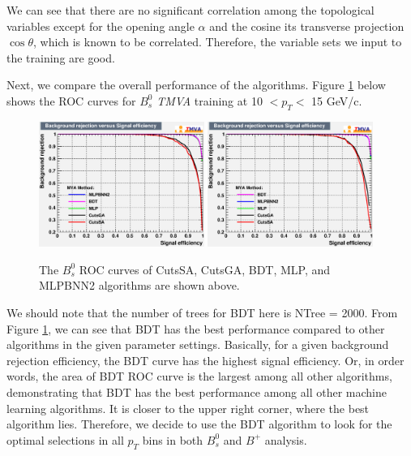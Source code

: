 We can see that there are no significant correlation among the topological variables except for the opening angle $\alpha$ and the cosine its transverse projection $ \cos\theta$, which is known to be correlated. Therefore, the variable sets we input to the  training are good.  

Next, we compare the overall performance of the algorithms. Figure \ref{ROCAll} below shows the ROC curves for $B^0_s$ \textit{TMVA} training at 10 $< p_T < $ 15 GeV/c.

\begin{figure}[h]
\begin{center}
\includegraphics[width= 0.48\textwidth]{Figures/Chapter5/BsROC1015.eps}
\includegraphics[width= 0.48\textwidth]{Figures/Chapter5/BsROC1520.eps}
\caption{The $B^0_s$ ROC curves of CutsSA, CutsGA, BDT, MLP, and MLPBNN2 algorithms are shown above.}
\label{ROCAll}
\end{center}
\end{figure}

We should note that the number of trees for BDT here is NTree = 2000. From Figure \ref{ROCAll}, we can see that BDT has the best performance compared to other algorithms in the given parameter settings. Basically, for a given background rejection efficiency, the BDT curve has the highest signal efficiency. Or, in order words, the area of BDT ROC curve is the largest among all other algorithms, demonstrating that BDT has the best performance among all other machine learning algorithms. It is closer to the upper right corner, where the best algorithm lies. Therefore, we decide to use the BDT algorithm to look for the optimal selections in all $p_T$ bins in both $B^0_s$ and $B^+$ analysis.


